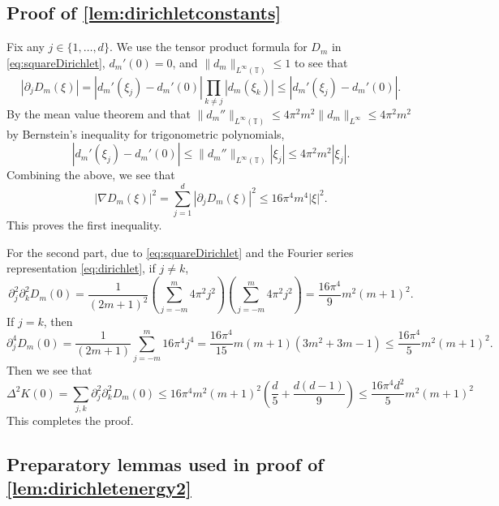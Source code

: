 \documentclass[11pt]{article}
\theoremstyle{definition}
\numberwithin{theorem}{section}
\numberwithin{lemma}{section}
\numberwithin{equation}{section}
\def\T{\mathbb{T}}
\numberwithin{equation}{section}
\begin{document}
	
	\subsection{Proof of \cref{lem:dirichletconstants}}
	\label{proof:dirichletconstants}
	
		Fix any $j\in \{1,\dots,d\}$. We use the tensor product formula for $D_m$ in \eqref{eq:squareDirichlet}, $d_m'(0)=0$, and $\|d_m\|_{L^\infty(\T)}\leq 1$ to see that
		$$
		|\partial_j D_m(\xi)|
		= |d_m'(\xi_j)-d_m'(0)|\prod_{k\ne j} |d_m(\xi_k)|
		\leq |d_m'(\xi_j)-d_m'(0)|.
		$$
		By the mean value theorem and that $\|d_m''\|_{L^\infty(\T)}\leq 4\pi^2 m^2 \|d_m\|_{L^\infty}\leq 4\pi^2 m^2$ by Bernstein's inequality for trigonometric polynomials, 
		$$
		|d_m'(\xi_j)-d_m'(0)|
		\leq \|d_m''\|_{L^\infty(\T)} |\xi_j|
		\leq 4\pi^2 m^2 |\xi_j|.
		$$
		Combining the above, we see that
		$$
		|\nabla D_m(\xi)|^2
		=\sum_{j=1}^d |\partial_j D_m(\xi)|^2
		\leq 16\pi^4 m^4 |\xi|^2. 
		$$
		This proves the first inequality.
		
		For the second part, due to \eqref{eq:squareDirichlet} and the Fourier series representation \eqref{eq:dirichlet}, if $j\ne k$, 
		$$
		\partial_j^2 \partial_k^2 D_m(0)
		= \frac{1}{(2m+1)^2}\left( \sum_{j=-m}^m 4\pi^2 j^2 \right)\left( \sum_{j=-m}^m 4\pi^2 j^2 \right)
		=\frac{16\pi^4}{9}m^2 (m+1)^2. 
		$$
		If $j=k$, then 
		$$
		\partial_j^4 D_m(0)
		= \frac{1}{(2m+1)}\sum_{j=-m}^m 16\pi^4 j^4
		=\frac{16\pi^4}{15} m (m+1)(3m^2+3m-1)
		\leq \frac{16\pi^4}{5} m^2 (m+1)^2. 
		$$
		Then we see that
		$$
		\Delta^2 K(0)
		=\sum_{j,k} \partial_j^2 \partial_k^2 D_m(0)
		\leq 16\pi^4 m^2 (m+1)^2 \left( \frac{d}{5} + \frac{d(d-1)}{9} \right)
		\leq \frac{16\pi^4 d^2}5 m^2 (m+1)^2
		$$
		This completes the proof. 
	
	\subsection{Preparatory lemmas used in proof of \cref{lem:dirichletenergy2}}
	\label{proof:dirichletenergy2}
	
\end{document}
